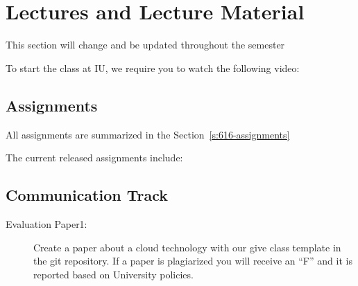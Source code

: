 \section{Lectures and Lecture Material}\label{S:lectures-516}

\begin{WARNING}
This section will change and be updated throughout the semester
\end{WARNING}


\begin{IU}

To start the class at IU, we require you to watch the following video:


\end{IU}

\subsection{Assignments}

All assignments are summarized in the Section~\ref{s:616-assignments}

The current released assignments include:



\subsection{Communication Track}




\begin{description}
\item[Evaluation Paper1:] Create a paper about a cloud technology with
  our give class template in the git repository. If a paper is
  plagiarized you will receive an ``F'' and it is reported based on
  University policies.
\end{description}


